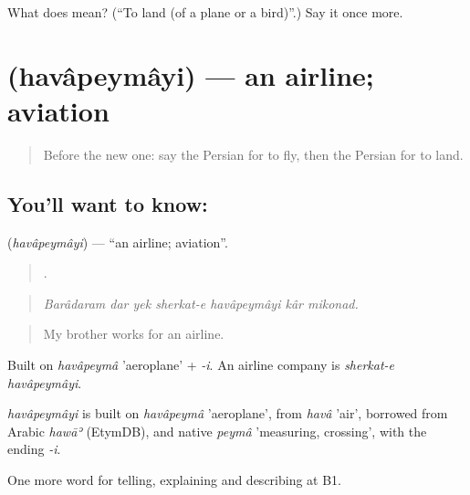 \begin{tcolorbox}[breakable,colback=teal!4,colframe=teal!35!black,title={Before you move on}]
What does   mean? (\textquotedblleft{}To land (of a plane or a bird)\textquotedblright{}.) Say it once more.
\end{tcolorbox}
\section[\texorpdfstring{\fa{هواپیمایی} (havâpeymâyi)}{هواپیمایی (havâpeymâyi)}]{ (havâpeymâyi) — an airline; aviation}

\label{lesson:FA-C431-havapeymayi}



\begin{quote}
Before the new one: say the Persian for to fly, then the Persian for to land.
\end{quote}

\subsection*{You'll want to know: }
\textbf{} (\emph{havâpeymâyi}) — \textquotedblleft{}an airline; aviation\textquotedblright{}.

\begin{quote}
      .
\end{quote}

\begin{quote}
\emph{Barâdaram dar yek sherkat-e havâpeymâyi kâr mikonad.}
\end{quote}

\begin{quote}
My brother works for an airline.
\end{quote}

Built on \emph{havâpeymâ} 'aeroplane' + \emph{-i}. An airline company is \emph{sherkat-e havâpeymâyi}.

\begin{cousinweb}
\emph{havâpeymâyi} is built on \emph{havâpeymâ} 'aeroplane', from \emph{havâ} 'air', borrowed from Arabic \emph{hawāʾ} (EtymDB), and native \emph{peymâ} 'measuring, crossing', with the ending \emph{-i}.
\end{cousinweb}

\begin{grammarlens}[title={What you've built}]
One more word for telling, explaining and describing at B1.
\end{grammarlens}

